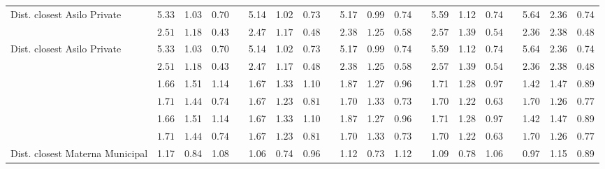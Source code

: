 \begin{center}
{\begin{longtable}{L{5cm} c c c p{.5cm} c c c p{.5cm} c c c p{.5cm} c c c p{.5cm} c c c}
Dist. closest Asilo Private & 5.33 &      1.03 &      0.70 & &      5.14 &      1.02 &      0.73 & &      5.17 &      0.99 &      0.74 & &      5.59 &      1.12 &      0.74 & &      5.64 &      2.36 &      0.74 \\*
& $\mathit{     2.51}$ & $\mathit{     1.18}$ & $\mathit{     0.43}$ & & $\mathit{     2.47}$ & $\mathit{     1.17}$ & $\mathit{     0.48}$ & & $\mathit{     2.38}$ & $\mathit{     1.25}$ & $\mathit{     0.58}$ & & $\mathit{     2.57}$ & $\mathit{     1.39}$ & $\mathit{     0.54}$ & & $\mathit{     2.36}$ & $\mathit{     2.38}$ & $\mathit{     0.48}$ \\[.7em]
Dist. closest Asilo Private & 5.33 &      1.03 &      0.70 & &      5.14 &      1.02 &      0.73 & &      5.17 &      0.99 &      0.74 & &      5.59 &      1.12 &      0.74 & &      5.64 &      2.36 &      0.74 \\*
& $\mathit{     2.51}$ & $\mathit{     1.18}$ & $\mathit{     0.43}$ & & $\mathit{     2.47}$ & $\mathit{     1.17}$ & $\mathit{     0.48}$ & & $\mathit{     2.38}$ & $\mathit{     1.25}$ & $\mathit{     0.58}$ & & $\mathit{     2.57}$ & $\mathit{     1.39}$ & $\mathit{     0.54}$ & & $\mathit{     2.36}$ & $\mathit{     2.38}$ & $\mathit{     0.48}$ \\[.7em]
 & 1.66 &      1.51 &      1.14 & &      1.67 &      1.33 &      1.10 & &      1.87 &      1.27 &      0.96 & &      1.71 &      1.28 &      0.97 & &      1.42 &      1.47 &      0.89 \\*
& $\mathit{     1.71}$ & $\mathit{     1.44}$ & $\mathit{     0.74}$ & & $\mathit{     1.67}$ & $\mathit{     1.23}$ & $\mathit{     0.81}$ & & $\mathit{     1.70}$ & $\mathit{     1.33}$ & $\mathit{     0.73}$ & & $\mathit{     1.70}$ & $\mathit{     1.22}$ & $\mathit{     0.63}$ & & $\mathit{     1.70}$ & $\mathit{     1.26}$ & $\mathit{     0.77}$ \\[.7em]
 & 1.66 &      1.51 &      1.14 & &      1.67 &      1.33 &      1.10 & &      1.87 &      1.27 &      0.96 & &      1.71 &      1.28 &      0.97 & &      1.42 &      1.47 &      0.89 \\*
& $\mathit{     1.71}$ & $\mathit{     1.44}$ & $\mathit{     0.74}$ & & $\mathit{     1.67}$ & $\mathit{     1.23}$ & $\mathit{     0.81}$ & & $\mathit{     1.70}$ & $\mathit{     1.33}$ & $\mathit{     0.73}$ & & $\mathit{     1.70}$ & $\mathit{     1.22}$ & $\mathit{     0.63}$ & & $\mathit{     1.70}$ & $\mathit{     1.26}$ & $\mathit{     0.77}$ \\[.7em]
Dist. closest Materna Municipal & 1.17 &      0.84 &      1.08 & &      1.06 &      0.74 &      0.96 & &      1.12 &      0.73 &      1.12 & &      1.09 &      0.78 &      1.06 & &      0.97 &      1.15 &      0.89 \\*

\end{longtable}}
\end{center}
